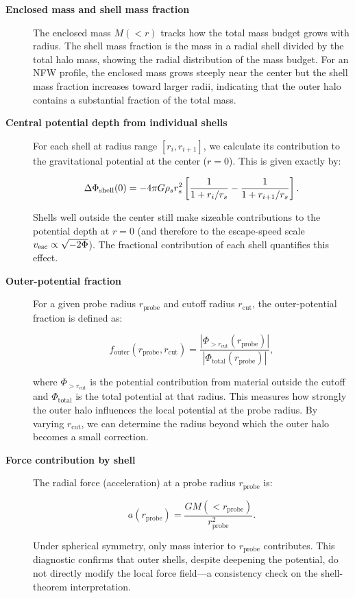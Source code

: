 \begin{description}

\item[\textbf{Enclosed mass and shell mass fraction}]
The enclosed mass $M(<r)$ tracks how the total mass budget grows with radius. The shell mass fraction is the mass in a radial shell divided by the total halo mass, showing the radial distribution of the mass budget. For an NFW profile, the enclosed mass grows steeply near the center but the shell mass fraction increases toward larger radii, indicating that the outer halo contains a substantial fraction of the total mass.

\item[\textbf{Central potential depth from individual shells}]
For each shell at radius range $[r_i, r_{i+1}]$, we calculate its contribution to the gravitational potential at the center ($r = 0$). This is given exactly by:

\begin{equation}
\Delta\Phi_{\rm shell}(0) = -4\pi G \rho_s r_s^2 \left[ \frac{1}{1 + r_i/r_s} - \frac{1}{1 + r_{i+1}/r_s} \right].
\end{equation}

Shells well outside the center still make sizeable contributions to the potential depth at $r = 0$ (and therefore to the escape-speed scale $v_{\rm esc} \propto \sqrt{-2\Phi}$). The fractional contribution of each shell quantifies this effect.

\item[\textbf{Outer-potential fraction}]
For a given probe radius $r_{\mathrm{probe}}$ and cutoff radius $r_{\mathrm{cut}}$, the outer-potential fraction is defined as:

\begin{equation}
f_{\mathrm{outer}}(r_{\mathrm{probe}}, r_{\mathrm{cut}}) = \frac{\left|\Phi_{>r_{\mathrm{cut}}}(r_{\mathrm{probe}})\right|}{\left|\Phi_{\mathrm{total}}(r_{\mathrm{probe}})\right|},
\end{equation}

where $\Phi_{>r_{\mathrm{cut}}}$ is the potential contribution from material outside the cutoff and $\Phi_{\mathrm{total}}$ is the total potential at that radius. This measures how strongly the outer halo influences the local potential at the probe radius. By varying $r_{\mathrm{cut}}$, we can determine the radius beyond which the outer halo becomes a small correction.

\item[\textbf{Force contribution by shell}]
The radial force (acceleration) at a probe radius $r_{\mathrm{probe}}$ is:

\begin{equation}
a(r_{\mathrm{probe}}) = \frac{G M(<r_{\mathrm{probe}})}{r_{\mathrm{probe}}^2}.
\end{equation}

Under spherical symmetry, only mass interior to $r_{\mathrm{probe}}$ contributes. This diagnostic confirms that outer shells, despite deepening the potential, do not directly modify the local force field---a consistency check on the shell-theorem interpretation.

\end{description}

